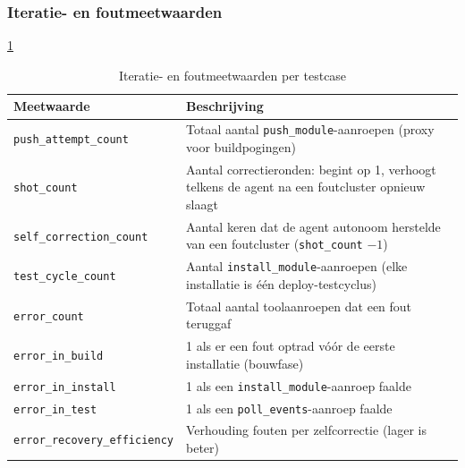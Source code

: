 \subsubsection*{Iteratie- en foutmeetwaarden}
\ref{tab:meetwaarden-iteratie}
\begin{table}[h]
\centering
\begin{tabular}{lp{9cm}}
\hline
\textbf{Meetwaarde} & \textbf{Beschrijving} \\
\hline
\texttt{push\_attempt\_count} & Totaal aantal \texttt{push\_module}-aanroepen (proxy voor buildpogingen) \\
\texttt{shot\_count} & Aantal correctieronden: begint op 1, verhoogt telkens de agent na een foutcluster opnieuw slaagt \\
\texttt{self\_correction\_count} & Aantal keren dat de agent autonoom herstelde van een foutcluster (\texttt{shot\_count} $- 1$) \\
\texttt{test\_cycle\_count} & Aantal \texttt{install\_module}-aanroepen (elke installatie is één deploy-testcyclus) \\
\texttt{error\_count} & Totaal aantal toolaanroepen dat een fout teruggaf \\
\texttt{error\_in\_build} & 1 als er een fout optrad vóór de eerste installatie (bouwfase) \\
\texttt{error\_in\_install} & 1 als een \texttt{install\_module}-aanroep faalde \\
\texttt{error\_in\_test} & 1 als een \texttt{poll\_events}-aanroep faalde \\
\texttt{error\_recovery\_efficiency} & Verhouding fouten per zelfcorrectie (lager is beter) \\
\hline
\end{tabular}
\caption{Iteratie- en foutmeetwaarden per testcase}\label{tab:meetwaarden-iteratie}
\end{table}

